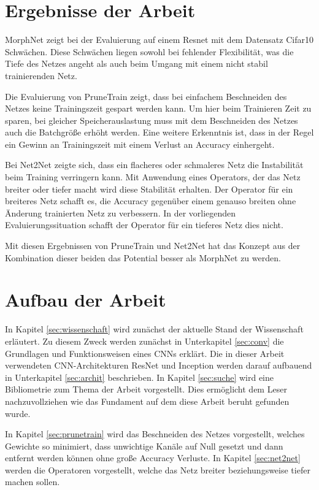 \section{Ergebnisse der Arbeit}\label{sec:ergebnis}
MorphNet zeigt bei der Evaluierung auf einem Resnet mit dem Datensatz Cifar10 Schwächen. Diese Schwächen liegen sowohl bei fehlender Flexibilität, was die Tiefe des Netzes angeht als auch beim Umgang mit einem nicht stabil trainierenden Netz.

Die Evaluierung von PruneTrain zeigt, dass bei einfachem Beschneiden des Netzes keine Trainingszeit gespart werden kann. Um hier beim Trainieren Zeit zu sparen, bei gleicher Speicherauslastung muss mit dem Beschneiden des Netzes auch die Batchgröße erhöht werden. Eine weitere Erkenntnis ist, dass in der Regel ein Gewinn an Trainingszeit mit einem Verlust an Accuracy einhergeht.

Bei Net2Net zeigte sich, dass ein flacheres oder schmaleres Netz die Instabilität beim Training verringern kann. Mit Anwendung eines Operators, der das Netz breiter oder tiefer macht wird diese Stabilität erhalten. Der Operator für ein breiteres Netz schafft es, die Accuracy gegenüber einem genauso breiten ohne Änderung trainierten Netz zu verbessern. In der vorliegenden Evaluierungssituation schafft der Operator für ein tieferes Netz dies nicht.


Mit diesen Ergebnissen von PruneTrain und Net2Net hat das Konzept aus der Kombination dieser beiden das Potential besser als MorphNet zu werden.

\section{Aufbau der Arbeit}\label{sec:aufbau}
In Kapitel \ref{sec:wissenschaft} wird zunächst der aktuelle Stand der Wissenschaft erläutert. Zu diesem Zweck werden zunächst in Unterkapitel \ref{sec:conv} die Grundlagen und Funktionsweisen eines CNNs erklärt. Die in dieser Arbeit verwendeten CNN-Architekturen ResNet und Inception werden darauf aufbauend in Unterkapitel \ref{sec:archit} beschrieben. In Kapitel \ref{sec:suche} wird eine Bibliometrie zum Thema der Arbeit vorgestellt. Dies ermöglicht dem Leser nachzuvollziehen wie das Fundament auf dem diese Arbeit beruht gefunden wurde. 


In Kapitel \ref{sec:prunetrain} wird das Beschneiden des Netzes vorgestellt, welches Gewichte so minimiert, dass unwichtige Kanäle auf Null gesetzt und dann entfernt werden können ohne große Accuracy Verluste. In Kapitel \ref{sec:net2net} werden die Operatoren vorgestellt, welche das Netz breiter beziehungsweise tiefer machen sollen.



